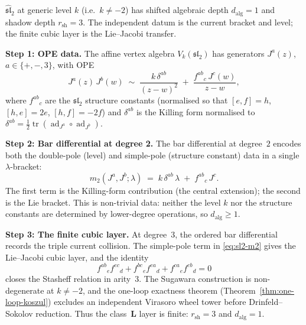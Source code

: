 \begin{computation}
\label{comp:shadow-depth-sl2}

$\hat{\mathfrak{sl}}_2$ at generic level $k$
(i.e.\ $k\neq -2$) has shifted algebraic depth
$d_{\mathrm{alg}}=1$ and shadow depth $r_{\mathrm{sh}}=3$.
The independent datum is the current bracket and level; the
finite cubic layer is the Lie--Jacobi transfer.

\medskip
\noindent\textbf{Step 1: OPE data.}
The affine vertex algebra $V_k(\mathfrak{sl}_2)$ has
generators $J^a(z)$, $a\in\{+,-,3\}$, with OPE
\begin{equation}\label{eq:sl2-ope}
J^a(z)\, J^b(w) \;\sim\;
\frac{k\,\delta^{ab}}{(z-w)^2}
\;+\;
\frac{f^{ab}{}_{c}\, J^c(w)}{z-w},
\end{equation}
where $f^{ab}{}_{c}$ are the $\mathfrak{sl}_2$ structure
constants (normalised so that $[e,f]=h$, $[h,e]=2e$,
$[h,f]=-2f$) and $\delta^{ab}$ is the Killing form
normalised to $\delta^{ab}=\tfrac{1}{2}\operatorname{tr}
(\operatorname{ad}_{J^a}\circ\operatorname{ad}_{J^b})$.

\medskip
\noindent\textbf{Step 2: Bar differential at degree 2.}
The bar differential at degree~$2$ encodes both the
double-pole (level) and simple-pole (structure constant)
data in a single $\lambda$-bracket:
\begin{equation}\label{eq:sl2-m2}
m_2(J^a, J^b;\lambda)
\;=\;
k\,\delta^{ab}\,\lambda
\;+\;
f^{ab}{}_{c}\, J^c.
\end{equation}
The first term is the Killing-form contribution (the
central extension); the second is the Lie bracket.
This is non-trivial data: neither the level $k$ nor the
structure constants are determined by lower-degree
operations, so $d_{\mathrm{alg}}\ge 1$.

\medskip
\noindent\textbf{Step 3: The finite cubic layer.}
At degree~$3$, the ordered bar differential records the triple
current collision. The simple-pole term in \eqref{eq:sl2-m2}
gives the Lie--Jacobi cubic layer, and the identity
\[
f^{ab}{}_{e}f^{ec}{}_{d}
+f^{bc}{}_{e}f^{ea}{}_{d}
+f^{ca}{}_{e}f^{eb}{}_{d}=0
\]
closes the Stasheff relation in arity~$3$. The Sugawara
construction is non-degenerate at $k\neq-2$, and the one-loop
exactness theorem (Theorem~\ref{thm:one-loop-koszul}) excludes an
independent Virasoro wheel tower before Drinfeld--Sokolov
reduction. Thus the class~$\mathbf L$ layer is finite:
$r_{\mathrm{sh}}=3$ and $d_{\mathrm{alg}}=1$.


\end{computation}

